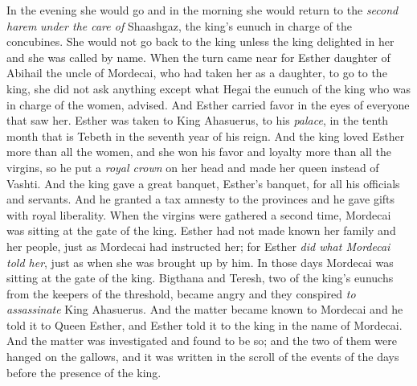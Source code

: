 \begin{biblechapter}
\verse In the evening she would go and in the morning she would return to the \textit{second harem} \textit{under the care of} Shaashgaz, the king’s eunuch in charge of the concubines. She would not go back to the king unless the king delighted in her and she was called by name.
\verse When the turn came near for Esther daughter of Abihail the uncle of Mordecai, who had taken her as a daughter, to go to the king, she did not ask anything except what Hegai the eunuch of the king who was in charge of the women, advised. And Esther carried favor in the eyes of everyone that saw her.
\verse Esther was taken to King Ahasuerus, to his \textit{palace}, in the tenth month that is Tebeth in the seventh year of his reign.
\verse And the king loved Esther more than all the women, and she won his favor and loyalty more than all the virgins, so he put a \textit{royal crown} on her head and made her queen instead of Vashti.
\verse And the king gave a great banquet, Esther’s banquet, for all his officials and servants. And he granted a tax amnesty to the provinces and he gave gifts with royal liberality.
 When the virgins were gathered a second time, Mordecai was sitting at the gate of the king.
\verse Esther had not made known her family and her people, just as Mordecai had instructed her; for Esther \textit{did what Mordecai told her}, just as when she was brought up by him.
\verse In those days Mordecai was sitting at the gate of the king. Bigthana and Teresh, two of the king’s eunuchs from the keepers of the threshold, became angry and they conspired \textit{to assassinate} King Ahasuerus.
\verse And the matter became known to Mordecai and he told it to Queen Esther, and Esther told it to the king in the name of Mordecai.
\verse And the matter was investigated and found to be so; and the two of them were hanged on the gallows, and it was written in the scroll of the events of the days before the presence of the king.
\end{biblechapter}

